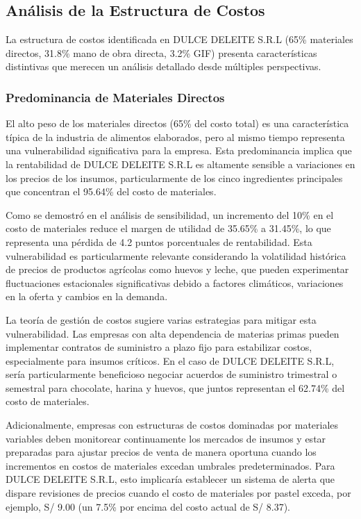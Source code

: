\documentclass[
  stu,
  floatsintext,
  longtable,
  a4paper,
  nolmodern,
  notxfonts,
  notimes,
  12pt,
  colorlinks=true,linkcolor=blue,citecolor=blue,urlcolor=blue]{apa7}
\begin{document}
\subsection{Análisis de la Estructura de
Costos}\label{anuxe1lisis-de-la-estructura-de-costos-1}

La estructura de costos identificada en DULCE DELEITE S.R.L (65\%
materiales directos, 31.8\% mano de obra directa, 3.2\% GIF) presenta
características distintivas que merecen un análisis detallado desde
múltiples perspectivas.

\subsubsection{Predominancia de Materiales
Directos}\label{predominancia-de-materiales-directos}

El alto peso de los materiales directos (65\% del costo total) es una
característica típica de la industria de alimentos elaborados, pero al
mismo tiempo representa una vulnerabilidad significativa para la
empresa. Esta predominancia implica que la rentabilidad de DULCE DELEITE
S.R.L es altamente sensible a variaciones en los precios de los insumos,
particularmente de los cinco ingredientes principales que concentran el
95.64\% del costo de materiales.

Como se demostró en el análisis de sensibilidad, un incremento del 10\%
en el costo de materiales reduce el margen de utilidad de 35.65\% a
31.45\%, lo que representa una pérdida de 4.2 puntos porcentuales de
rentabilidad. Esta vulnerabilidad es particularmente relevante
considerando la volatilidad histórica de precios de productos agrícolas
como huevos y leche, que pueden experimentar fluctuaciones estacionales
significativas debido a factores climáticos, variaciones en la oferta y
cambios en la demanda.

La teoría de gestión de costos sugiere varias estrategias para mitigar
esta vulnerabilidad. Las empresas con alta dependencia de materias
primas pueden implementar contratos de suministro a plazo fijo para
estabilizar costos, especialmente para insumos críticos. En el caso de
DULCE DELEITE S.R.L, sería particularmente beneficioso negociar acuerdos
de suministro trimestral o semestral para chocolate, harina y huevos,
que juntos representan el 62.74\% del costo de materiales.

Adicionalmente, empresas con estructuras de costos dominadas por
materiales variables deben monitorear continuamente los mercados de
insumos y estar preparadas para ajustar precios de venta de manera
oportuna cuando los incrementos en costos de materiales excedan umbrales
predeterminados. Para DULCE DELEITE S.R.L, esto implicaría establecer un
sistema de alerta que dispare revisiones de precios cuando el costo de
materiales por pastel exceda, por ejemplo, S/ 9.00 (un 7.5\% por encima
del costo actual de S/ 8.37).
\end{document}
